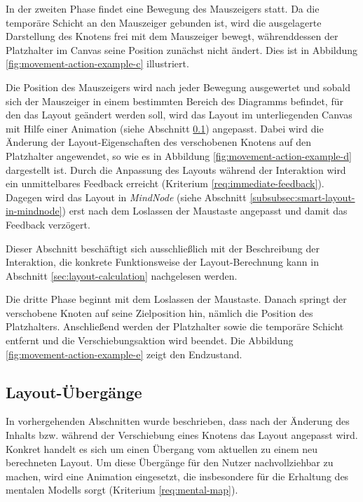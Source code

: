 In der zweiten Phase findet eine Bewegung des Mauszeigers statt. Da die temporäre Schicht an den Mauszeiger gebunden ist, wird die ausgelagerte Darstellung des Knotens frei mit dem Mauszeiger bewegt, währenddessen der Platzhalter im Canvas seine Position zunächst nicht ändert. Dies ist in Abbildung \ref{fig:movement-action-example-c} illustriert.

Die Position des Mauszeigers wird nach jeder Bewegung ausgewertet und sobald sich der Mauszeiger in einem bestimmten Bereich des Diagramms befindet, für den das Layout geändert werden soll, wird das Layout im unterliegenden Canvas mit Hilfe einer Animation (siehe Abschnitt \ref{subsec:layout-transitions}) angepasst. Dabei wird die Änderung der Layout-Eigenschaften des verschobenen Knotens auf den Platzhalter angewendet, so wie es in Abbildung \ref{fig:movement-action-example-d} dargestellt ist. Durch die Anpassung des Layouts während der Interaktion wird ein unmittelbares Feedback erreicht (Kriterium \ref{req:immediate-feedback}). Dagegen wird das Layout in \textit{MindNode} (siehe Abschnitt \ref{subsubsec:smart-layout-in-mindnode}) erst nach dem Loslassen der Maustaste angepasst und damit das Feedback verzögert.

Dieser Abschnitt beschäftigt sich ausschließlich mit der Beschreibung der Interaktion, die konkrete Funktionsweise der Layout-Berechnung kann in Abschnitt \ref{sec:layout-calculation} nachgelesen werden.

Die dritte Phase beginnt mit dem Loslassen der Maustaste. Danach springt der verschobene Knoten auf seine Zielposition hin, nämlich die Position des Platzhalters. Anschließend werden der Platzhalter sowie die temporäre Schicht entfernt und die Verschiebungsaktion wird beendet. Die Abbildung \ref{fig:movement-action-example-e} zeigt den Endzustand.

\subsection{Layout-Übergänge}
\label{subsec:layout-transitions}

In vorhergehenden Abschnitten wurde beschrieben, dass nach der Änderung des Inhalts bzw. während der Verschiebung eines Knotens das Layout angepasst wird. Konkret handelt es sich um einen Übergang vom aktuellen zu einem neu berechneten Layout. Um diese Übergänge für den Nutzer nachvollziehbar zu machen, wird eine Animation eingesetzt, die insbesondere für die Erhaltung des mentalen Modells sorgt (Kriterium \ref{req:mental-map}).

